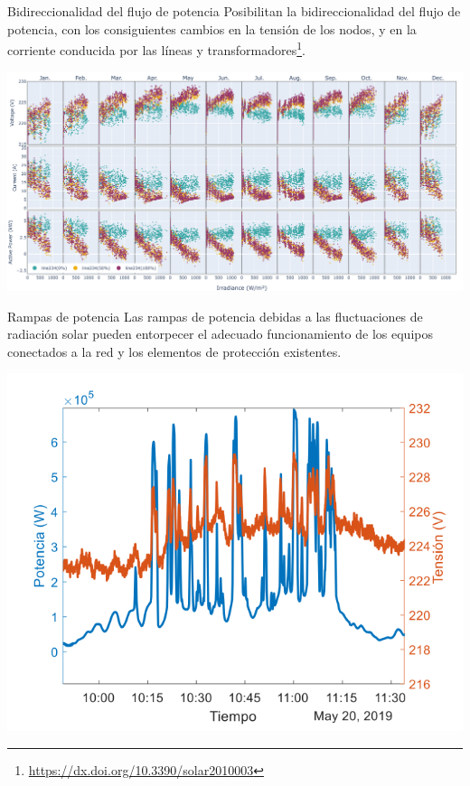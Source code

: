 \documentclass[aspectratio=169, usenames,svgnames,dvipsnames]{beamer}
\begin{document}
\begin{frame}[label={sec:org95d56d0}]{Bidireccionalidad del flujo de potencia}
Posibilitan la \alert{bidireccionalidad del flujo de potencia}, con los
consiguientes \alert{cambios en la tensión de los nodos}, y \alert{en la corriente}
conducida por las líneas y transformadores\footnote{\url{https://dx.doi.org/10.3390/solar2010003}}.

\begin{center}
\includegraphics[height=0.65\textheight]{../figs/S_VIP_Irr_line234.pdf}
\end{center}
\end{frame}

\begin{frame}[label={sec:orgbbca917}]{Rampas de potencia}
Las \alert{rampas de potencia} debidas a las \alert{fluctuaciones de radiación solar}
pueden entorpecer el adecuado funcionamiento de los equipos
conectados a la red y los elementos de protección existentes.

\begin{center}
\includegraphics[height=0.75\textheight]{../figs/VariacionTension_RampasPotencia.pdf}
\end{center}
\end{frame}
\end{document}

